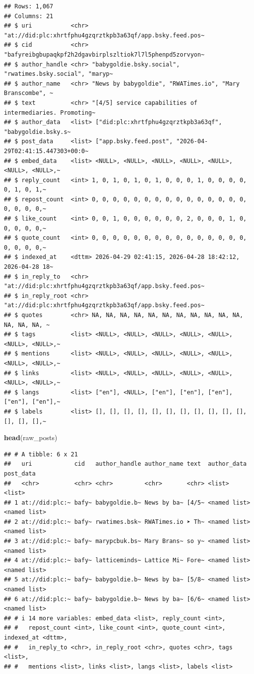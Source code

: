 \documentclass[
]{article}
\newenvironment{Shaded}{\begin{snugshade}}{\end{snugshade}}
\newcommand{\FunctionTok}[1]{\textcolor[rgb]{0.13,0.29,0.53}{\textbf{#1}}}
\newcommand{\NormalTok}[1]{#1}
\begin{document}
\begin{verbatim}
## Rows: 1,067
## Columns: 21
## $ uri           <chr> "at://did:plc:xhrtfphu4gzqrztkpb3a63qf/app.bsky.feed.pos~
## $ cid           <chr> "bafyreibgbupaqkpf2h2dgavbirplszltiok7l7l5phenpd5zorvyon~
## $ author_handle <chr> "babygoldie.bsky.social", "rwatimes.bsky.social", "maryp~
## $ author_name   <chr> "News by babygoldie", "RWATimes.io", "Mary Branscombe", ~
## $ text          <chr> "[4/5] service capabilities of intermediaries. Promoting~
## $ author_data   <list> ["did:plc:xhrtfphu4gzqrztkpb3a63qf", "babygoldie.bsky.s~
## $ post_data     <list> ["app.bsky.feed.post", "2026-04-29T02:41:15.447303+00:0~
## $ embed_data    <list> <NULL>, <NULL>, <NULL>, <NULL>, <NULL>, <NULL>, <NULL>,~
## $ reply_count   <int> 1, 0, 1, 0, 1, 0, 1, 0, 0, 0, 1, 0, 0, 0, 0, 0, 1, 0, 1,~
## $ repost_count  <int> 0, 0, 0, 0, 0, 0, 0, 0, 0, 0, 0, 0, 0, 0, 0, 0, 0, 0, 0,~
## $ like_count    <int> 0, 0, 1, 0, 0, 0, 0, 0, 0, 2, 0, 0, 0, 1, 0, 0, 0, 0, 0,~
## $ quote_count   <int> 0, 0, 0, 0, 0, 0, 0, 0, 0, 0, 0, 0, 0, 0, 0, 0, 0, 0, 0,~
## $ indexed_at    <dttm> 2026-04-29 02:41:15, 2026-04-28 18:42:12, 2026-04-28 18~
## $ in_reply_to   <chr> "at://did:plc:xhrtfphu4gzqrztkpb3a63qf/app.bsky.feed.pos~
## $ in_reply_root <chr> "at://did:plc:xhrtfphu4gzqrztkpb3a63qf/app.bsky.feed.pos~
## $ quotes        <chr> NA, NA, NA, NA, NA, NA, NA, NA, NA, NA, NA, NA, NA, NA, ~
## $ tags          <list> <NULL>, <NULL>, <NULL>, <NULL>, <NULL>, <NULL>, <NULL>,~
## $ mentions      <list> <NULL>, <NULL>, <NULL>, <NULL>, <NULL>, <NULL>, <NULL>,~
## $ links         <list> <NULL>, <NULL>, <NULL>, <NULL>, <NULL>, <NULL>, <NULL>,~
## $ langs         <list> ["en"], <NULL>, ["en"], ["en"], ["en"], ["en"], ["en"],~
## $ labels        <list> [], [], [], [], [], [], [], [], [], [], [], [], [], [],~
\end{verbatim}

\begin{Shaded}
\begin{Highlighting}[]
\FunctionTok{head}\NormalTok{(raw\_posts)}
\end{Highlighting}
\end{Shaded}

\begin{verbatim}
## # A tibble: 6 x 21
##   uri            cid   author_handle author_name text  author_data  post_data   
##   <chr>          <chr> <chr>         <chr>       <chr> <list>       <list>      
## 1 at://did:plc:~ bafy~ babygoldie.b~ News by ba~ [4/5~ <named list> <named list>
## 2 at://did:plc:~ bafy~ rwatimes.bsk~ RWATimes.io ➤ Th~ <named list> <named list>
## 3 at://did:plc:~ bafy~ marypcbuk.bs~ Mary Brans~ so y~ <named list> <named list>
## 4 at://did:plc:~ bafy~ latticeminds~ Lattice Mi~ Fore~ <named list> <named list>
## 5 at://did:plc:~ bafy~ babygoldie.b~ News by ba~ [5/8~ <named list> <named list>
## 6 at://did:plc:~ bafy~ babygoldie.b~ News by ba~ [6/6~ <named list> <named list>
## # i 14 more variables: embed_data <list>, reply_count <int>,
## #   repost_count <int>, like_count <int>, quote_count <int>, indexed_at <dttm>,
## #   in_reply_to <chr>, in_reply_root <chr>, quotes <chr>, tags <list>,
## #   mentions <list>, links <list>, langs <list>, labels <list>
\end{verbatim}
\end{document}
